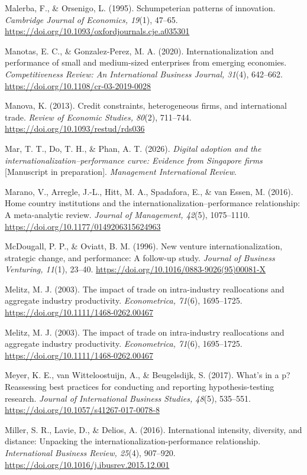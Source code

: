 \documentclass[
  a4paper,
  13pt]{extreport}
\begin{document}
Malerba, F., \& Orsenigo, L. (1995). Schumpeterian patterns of
innovation. \emph{Cambridge Journal of Economics, 19}(1), 47--65.
\url{https://doi.org/10.1093/oxfordjournals.cje.a035301}

Manotas, E. C., \& Gonzalez-Perez, M. A. (2020). Internationalization
and performance of small and medium-sized enterprises from emerging
economies. \emph{Competitiveness Review: An International Business
Journal, 31}(4), 642--662. \url{https://doi.org/10.1108/cr-03-2019-0028}

Manova, K. (2013). Credit constraints, heterogeneous firms, and
international trade. \emph{Review of Economic Studies, 80}(2), 711--744.
\url{https://doi.org/10.1093/restud/rds036}

Mar, T. T., Do, T. H., \& Phan, A. T. (2026). \emph{Digital adoption and
the internationalization--performance curve: Evidence from Singapore
firms} {[}Manuscript in preparation{]}. \emph{Management International
Review}.

Marano, V., Arregle, J.-L., Hitt, M. A., Spadafora, E., \& van Essen, M.
(2016). Home country institutions and the
internationalization--performance relationship: A meta-analytic review.
\emph{Journal of Management, 42}(5), 1075--1110.
\url{https://doi.org/10.1177/0149206315624963}

McDougall, P. P., \& Oviatt, B. M. (1996). New venture
internationalization, strategic change, and performance: A follow-up
study. \emph{Journal of Business Venturing, 11}(1), 23--40.
\url{https://doi.org/10.1016/0883-9026(95)00081-X}

Melitz, M. J. (2003). The impact of trade on intra-industry
reallocations and aggregate industry productivity. \emph{Econometrica,
71}(6), 1695--1725. \url{https://doi.org/10.1111/1468-0262.00467}

Melitz, M. J. (2003). The impact of trade on intra-industry
reallocations and aggregate industry productivity. \emph{Econometrica,
71}(6), 1695--1725. \url{https://doi.org/10.1111/1468-0262.00467}

Meyer, K. E., van Witteloostuijn, A., \& Beugelsdijk, S. (2017). What's
in a p? Reassessing best practices for conducting and reporting
hypothesis-testing research. \emph{Journal of International Business
Studies, 48}(5), 535--551.
\url{https://doi.org/10.1057/s41267-017-0078-8}

Miller, S. R., Lavie, D., \& Delios, A. (2016). International intensity,
diversity, and distance: Unpacking the internationalization-performance
relationship. \emph{International Business Review, 25}(4), 907--920.
\url{https://doi.org/10.1016/j.ibusrev.2015.12.001}
\end{document}
